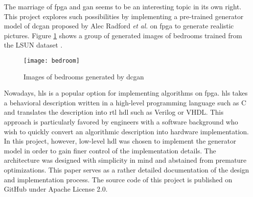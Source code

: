 The marriage of \gls{fpga} and \gls{gan} seems to be an interesting topic in its own right. This project
explores such possibilities by implementing a pre-trained generator model of \gls{dcgan} proposed by
Alec Radford \textit{et al.} \cite{radford:conv_gan} on \gls{fpga} to generate realistic pictures.
Figure \ref{fig:bedroom} shows a group of generated images of bedrooms trained from the LSUN dataset
\cite{yu15lsun}.

\begin{figure}[h]
  \centering
  \texttt{[image: bedroom]}
  \caption{Images of bedrooms generated by \gls{dcgan} \cite{radford:conv_gan}}
  \label{fig:bedroom}
\end{figure}

Nowadays, \gls{hls} is a popular option for implementing algorithms on \gls{fpga}. \gls{hls} takes a
behavioral description written in a high-level programming language such as C and translates the description
into \gls{rtl} \gls{hdl} such as Verilog or VHDL. This approach is particularly favored by engineers with
a software background who wish to quickly convert an algorithmic description into hardware implementation.
In this project, however, low-level \gls{hdl} was chosen to implement the generator model in order to gain
finer control of the implementation details. The architecture was designed with simplicity in mind and
abstained from premature optimizations. This paper serves as a rather detailed documentation of the design and
implementation process. The source code of this project is published on GitHub \cite{github:dcgan_fpga} under
Apache License 2.0.

\clearpage %
